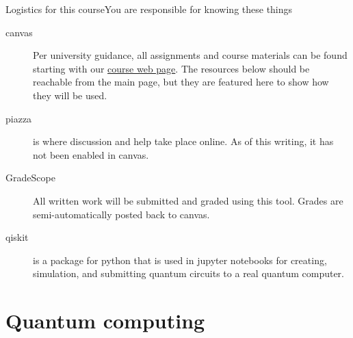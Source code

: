 \begin{frame}{Logistics for this course}{You are responsible for knowing these things}

\begin{description}
    \item[canvas]  Per university guidance, all assignments and course materials can be found starting with our \href{\CourseWebPage}{course web page}.  The resources below should be reachable from the main page, but they are featured here to show how they will be used.
    \item[piazza] is where discussion and help take place online.  As of this writing, it has not been enabled in canvas.
    \item[GradeScope] All written work will be submitted and graded using this tool.  Grades are semi-automatically posted back to canvas.
    \item[qiskit] is a package for python that is used in jupyter notebooks for creating, simulation, and submitting quantum circuits to a real quantum computer.
\end{description}
\end{frame}

\section{Quantum computing}

